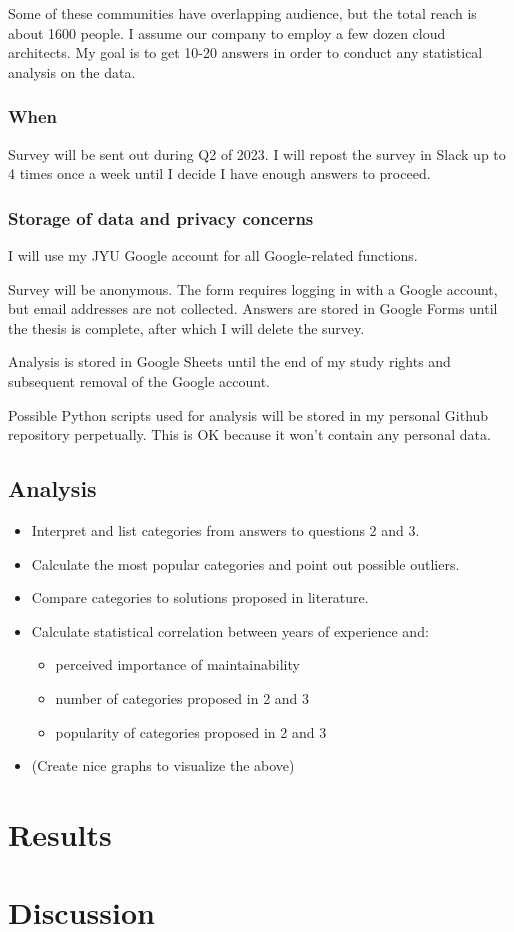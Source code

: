 \documentclass[utf8,english]{gradu3}
\begin{document}
Some of these communities have overlapping audience, but the total reach is about 1600 people.
I assume our company to employ a few dozen cloud architects.
My goal is to get 10-20 answers in order to conduct any statistical analysis on
the data.

\subsection{When}
Survey will be sent out during Q2 of 2023.
I will repost the survey in Slack up to 4 times once a week until I decide I
have enough answers to proceed.

\subsection{Storage of data and privacy concerns}
I will use my JYU Google account for all Google-related functions.

Survey will be anonymous.
The form requires logging in with a Google account, but email addresses are not collected.
Answers are stored in Google Forms until the thesis is complete,
after which I will delete the survey.

Analysis is stored in Google Sheets until the end of my study rights and
subsequent removal of the Google account.

Possible Python scripts used for analysis will be stored in my personal Github repository
perpetually.
This is OK because it won't contain any personal data.


\section{Analysis}

\begin{itemize}
  \item Interpret and list categories from answers to questions 2 and 3.
  \item Calculate the most popular categories and point out possible outliers.
  \item Compare categories to solutions proposed in literature.
  \item Calculate statistical correlation between years of experience and:
        \begin{itemize}
          \item perceived importance of maintainability
          \item number of categories proposed in 2 and 3
          \item popularity of categories proposed in 2 and 3
        \end{itemize}
  \item (Create nice graphs to visualize the above)
\end{itemize}


\chapter{Results}

\chapter{Discussion}

\printbibliography
\end{document}
